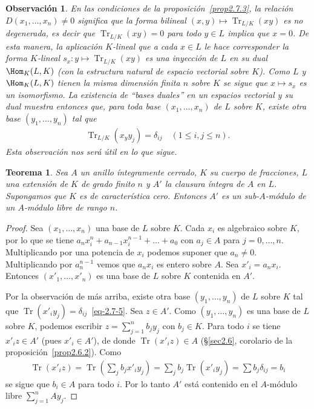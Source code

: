 \documentclass[oneside,bibtotoc,leqno,spanish]{amsbook}
\newcommand{\QED}{}%
\DeclareMathOperator{\Tr}{Tr}
\numberwithin{equation}{section}
\theoremstyle{defi}
\theoremstyle{note}
\newtheorem{theorem}{Teorema}
\theoremstyle{rem}
\newtheorem*{remark*}{Observaci\'on}
\numberwithin{theorem}{section}
\numberwithin{proposition}{section}
\numberwithin{definition}{section}
\numberwithin{lemma}{section}
\numberwithin{corollary}{section}
\numberwithin{example}{section}
\numberwithin{footnote}{section}%
\begin{document}
\begin{remark*}
En las condiciones de la proposici\'on~\ref{prop2.7.3}, la relaci\'on $D(x_{1},\dots,x_{n})\neq 0$ significa que
la forma bilineal $(x,y)\mapsto\Tr_{L/K}(xy)$ es {\em no degenerada,} es decir que $\Tr_{L/K}(xy) = 0$
para todo $y\in L$ implica que $x = 0$. De esta manera, la aplicaci\'on $K$-lineal que a cada $x\in L$
le hace corresponder la forma $K$-lineal $s_{x}:y\mapsto\Tr_{L/K}(xy)$ es una inyecci\'on de $L$ en su
dual $\Hom_{K}(L,K)$ (con la estructura natural de espacio vectorial sobre $K$). Como $L$ y $\Hom_{K}(L,K)$
tienen la misma dimensi\'on finita $n$ sobre $K$ se sigue que $x\mapsto s_{x}$ es un isomorfismo. La
existencia de {\em ``bases duales''} en un espacios vectorial y su dual muestra entonces que, para toda
base $(x_{1},\dots,x_{n})$ de $L$ sobre $K$, existe otra base $(y_{1},\dots,y_{n})$ tal que
\begin{gather}\label{eq-2.7-5}
\Tr_{L/K}(x_{y}y_{j}) = \delta_{ij}\quad(1\leq i, j\leq n).
\end{gather}
Esta observaci\'on nos ser\'a \'util en lo que sigue.
\end{remark*}

\begin{theorem}\label{teo2.7.1}
Sea $A$ un anillo \'integramente cerrado, $K$ su cuerpo de fracciones, $L$ una extensi\'on de $K$ de grado
finito $n$ y $A'$ la clausura \'integra de $A$ en $L$. Supongamos que $K$ es de caracter\'istica cero.
Entonces $A'$ es un sub-$A$-m\'odulo  de un $A$-m\'odulo libre de rango $n$.
\end{theorem}

\begin{proof}
Sea $(x_{1},\dots,x_{n})$ una base de $L$ sobre $K$. Cada $x_{i}$ es algebraico sobre $K$, por lo que se tiene
$a_{n}x_{i}^{n}+a_{n-1}x_{i}^{n-1}+\dots+a_{0}$ con $a_{j}\in A$ para $j=0,\dots,n$. Multiplicando por
una potencia de $x_{i}$ podemos suponer que $a_{n}\neq 0$. Multiplicando por $a_{n}^{n-1}$ vemos que $a_{n}x_{i}$
es entero sobre $A$. Sea $x'_{i} = a_{n}x_{i}$. Entonces $(x'_{1},\dots,x'_{n})$ es una base de $L$ sobre $K$
contenida en $A'$.

Por la observaci\'on de m\'as arriba, existe otra base $(y_{1},\dots,y_{n})$ de $L$ sobre $K$ tal que
$\Tr(x'_{i}y_{j}) = \delta_{ij}$~\eqref{eq-2.7-5}. Sea $z\in A'$. Como $(y_{1},\dots,y_{n})$ es una base de $L$
sobre $K$, podemos escribir $z = \sum_{j=1}^{n}b_{j}y_{j}$ con $b_{j}\in K$. Para todo $i$ se tiene
$x'_{i}z\in A'$ (pues $x'_{i}\in A'$), de donde $\Tr(x'_{i}z)\in A$ (\S\ref{sec2.6}, corolario de la
proposici\'on~\ref{prop2.6.2}). Como
\begin{gather*}
\Tr(x'_{i}z) = \Tr\left(\sum_{j}b_{j}x'_{i}y_{j}\right) = \sum_{j}b_{j}\Tr(x'_{i}y_{j}) = \sum b_{j}\delta_{ij} = b_{i}
\end{gather*}
se sigue que $b_{i}\in A$ para todo $i$. Por lo tanto $A'$ est\'a contenido en el $A$-m\'odulo libre
$\sum_{j=1}^{n}Ay_{j}$. \QED
\end{proof}
\end{document}

